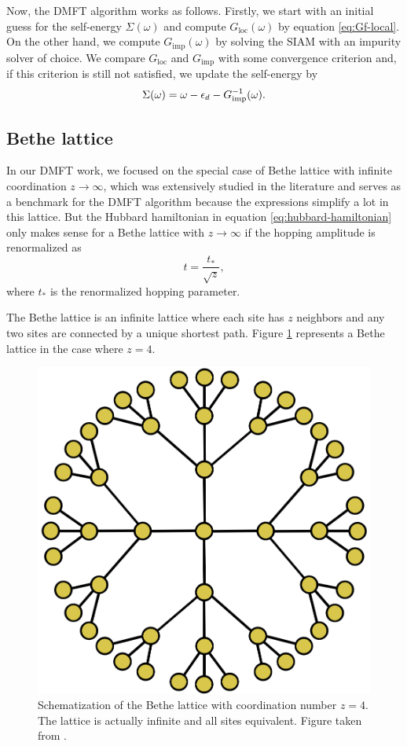 \documentclass[12pt]{report}
\begin{document}
Now, the DMFT algorithm works as follows. Firstly, we start with an initial guess for the self-energy $\Sigma(\omega)$ and compute $G_{\text{loc}}(\omega)$ by equation \ref{eq:Gf-local}. On the other hand, we compute $G_{\text{imp}}(\omega)$ by solving the SIAM with an impurity solver of choice. We compare $G_{\text{loc}}$ and $G_{\text{imp}}$ with some convergence criterion and, if this criterion is still not satisfied, we update the self-energy by
\begin{equation} \label{eq:self-energy-update}
\Sigma(\omega) = \omega - \epsilon_d - G_{\text{imp}}^{-1}(\omega).
\end{equation}

\subsection{Bethe lattice} \label{sec:bethe}

In our DMFT work, we focused on the special case of Bethe lattice with infinite coordination $z\to\infty$, which was extensively studied in the literature \cite{georges1996, thesis_dmft_graz} and serves as a benchmark for the DMFT algorithm because the expressions simplify a lot in this lattice. But the Hubbard hamiltonian in equation \ref{eq:hubbard-hamiltonian} only makes sense for a Bethe lattice with $z\to\infty$ if the hopping amplitude is renormalized as \cite{thesis_bruno}
\begin{equation} \label{eq:hopping-renormalization}
t = \frac{t_*}{\sqrt{z}},
\end{equation}
where $t_*$ is the renormalized hopping parameter.

The Bethe lattice is an infinite lattice where each site has $z$ neighbors and any two sites are connected by a unique shortest path. Figure \ref{fig:bethe-lattice} represents a Bethe lattice in the case where $z = 4$.
\begin{figure}[H]
\centering
\includegraphics[width=0.4\linewidth]{fig/bethe-lattice.png}
\caption{Schematization of the Bethe lattice with coordination number $z = 4$. The lattice is actually infinite and all sites equivalent. Figure taken from \cite{thesis_dmft_graz}.}
\label{fig:bethe-lattice}
\end{figure}
\end{document}
